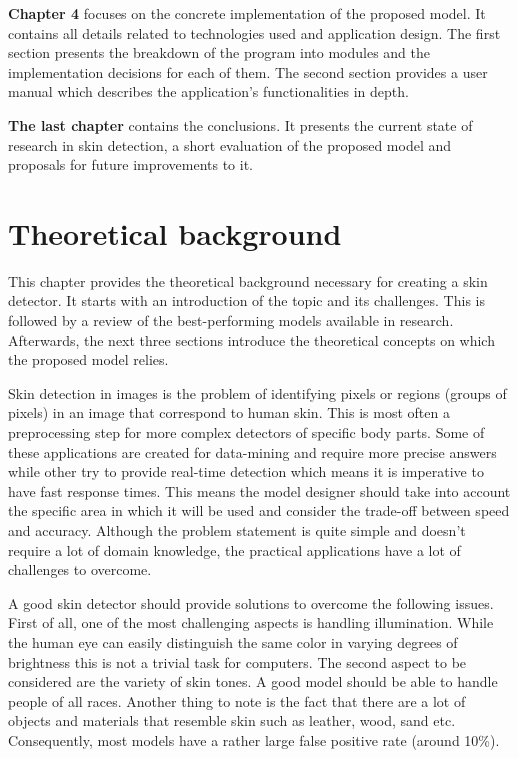 \documentclass[12pt]{report}
\begin{document}
	\textbf{Chapter 4} focuses on the concrete implementation of the proposed model. It contains all details related to technologies used and application design. The first section presents the breakdown of the program into modules and the implementation decisions for each of them. The second section provides a user manual which describes the application's functionalities in depth.
	
	\textbf{The last chapter} contains the conclusions. It presents the current state of research in skin detection, a short evaluation of the proposed model and proposals for future improvements to it.
	
	\chapter{Theoretical background}
	This chapter provides the theoretical background necessary for creating a skin detector. It starts with an introduction of the topic and its challenges. This is followed by a review of the best-performing models available in research. Afterwards, the next three sections introduce the theoretical concepts on which the proposed model relies.
	
	Skin detection in images is the problem of identifying pixels or regions (groups of pixels) in an image that correspond to human skin. This is most often a preprocessing step for more complex detectors of specific body parts. Some of these applications are created for data-mining and require more precise answers while other try to provide real-time detection which means it is imperative to have fast response times. This means the model designer should take into account the specific area in which it will be used and consider the trade-off between speed and accuracy. Although the problem statement is quite simple and doesn't require a lot of domain knowledge, the practical applications have a lot of challenges to overcome.
	
	A good skin detector should provide solutions to overcome the following issues. First of all, one of the most challenging aspects is handling illumination. While the human eye can easily distinguish the same color in varying degrees of brightness this is not a trivial task for computers. The second aspect to be considered are the variety of skin tones. A good model should be able to handle people of all races. Another thing to note is the fact that there are a lot of objects and materials that resemble skin such as leather, wood, sand etc. Consequently, most models have a rather large false positive rate (around 10\%).
	
\end{document}
